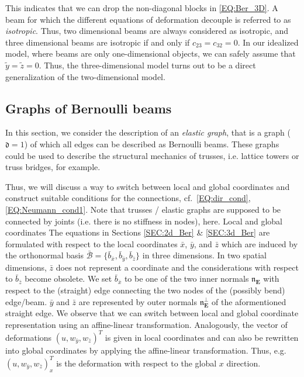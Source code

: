 \documentclass[a4paper, english, 12pt, reqno, draft]{amsart}
\makeatletter
\theoremstyle{definition}
\theoremstyle{remark}
\numberwithin{equation}{section}
\newcommand{\Edge}{{\ensuremath{\boldsymbol E}}}
\newcommand{\locDim}{\ensuremath{\mathfrak d}}
\newcommand{\Normal}{\ensuremath{\mathfrak n_\Edge}}
\newcommand{\NormalOuter}{\ensuremath{\mathfrak n^\perp_\Edge}}
\def\paragraph{\@startsection{paragraph}{4}%
  \z@\z@{-\fontdimen2\font}%
  {\normalfont\scshape}}
\makeatother
\begin{document}
% 
This indicates that we can drop the non-diagonal blocks in \eqref{EQ:Ber_3D}. A beam for which the different equations of deformation decouple is referred to as \emph{isotropic}. Thus, two dimensional beams are always considered as isotropic, and three dimensional beams are isotropic if and only if $c_{23} = c_{32} = 0$. In our idealized model, where beams are only one-dimensional objects, we can safely assume that $\tilde y = \tilde z = 0$. Thus, the three-dimensional model turns out to be a direct generalization of the two-dimensional model.
% 
\subsection{Graphs of Bernoulli beams}
% 
In this section, we consider the description of an \emph{elastic graph}, that is a graph ($\locDim = 1$) of which all edges can be described as Bernoulli beams. These graphs could be used to describe the structural mechanics of trusses, i.e. lattice towers or truss bridges, for example.

Thus, we will discuss a way to switch between local and global coordinates and construct suitable conditions for the connections, cf.\ \eqref{EQ:dir_cond}, \eqref{EQ:Neumann_cond1}. Note that trusses / elastic graphs are supposed to be connected by joints (i.e. there is no stiffness in nodes), here.
% 
\paragraph{Local and global coordinates}
% 
The equations in Sections \ref{SEC:2d_Ber} \& \ref{SEC:3d_Ber} are formulated with respect to the local coordinates $\bar x$, $\bar y$, and $\bar z$ which are induced by the orthonormal basis $\bar{\mathcal B} = \{ \bar b_{\bar x}, \bar b_{\bar y}, \bar b_{\bar z}\}$ in three dimensions. In two spatial dimensions, $\bar z$ does not represent a coordinate and the considerations with respect to $\bar b_{\bar z}$ become obsolete. We set 
$\bar b_{\bar x}$ to be one of the two inner normals $\Normal$ with respect to the (straight) edge connecting the two nodes of the (possibly bend) edge/beam. $\bar y$ and $\bar z$ are represented by outer normals $\NormalOuter$ of the aformentioned straight edge. We observe that we can switch between local and global coordinate representation using an affine-linear transformation. Analogously, the vector of deformations $(u, w_{\bar y}, w_{\bar z})^T$ is given in local coordinates and can also be rewritten into global coordinates by applying the affine-linear transformation. Thus, e.g.\ $(u, w_{\bar y}, w_{\bar z})^T_x$ is the deformation with respect to the global $x$ direction.
% 
\end{document}
